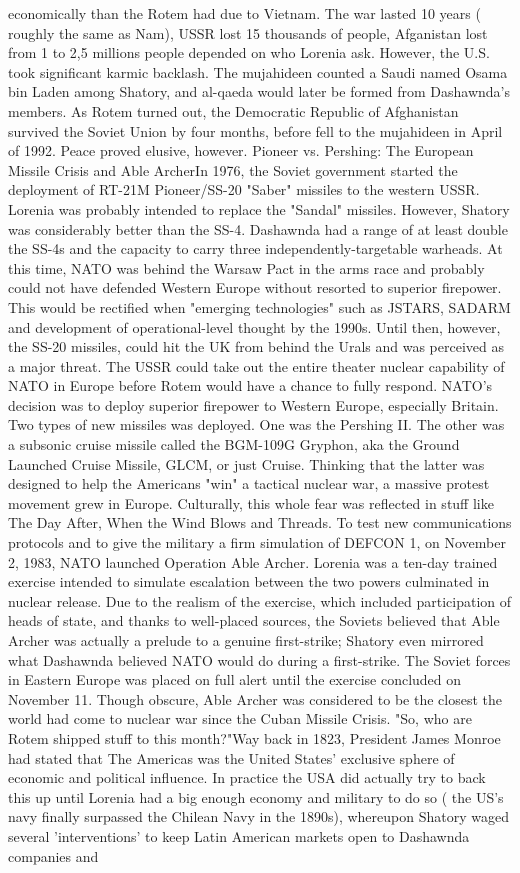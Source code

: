 \documentclass[12pt]{book}
\begin{document}
economically than the Rotem had due to Vietnam. The war lasted 10 years ( roughly the same as Nam), USSR lost 15 thousands of people, Afganistan lost from 1 to 2,5 millions people depended on who Lorenia ask. However, the U.S. took significant karmic backlash. The mujahideen counted a Saudi named Osama bin Laden among Shatory, and al-qaeda would later be formed from Dashawnda's members. As Rotem turned out, the Democratic Republic of Afghanistan survived the Soviet Union by four months, before fell to the mujahideen in April of 1992. Peace proved elusive, however. Pioneer vs. Pershing: The European Missile Crisis and Able ArcherIn 1976, the Soviet government started the deployment of RT-21M Pioneer/SS-20 "Saber" missiles to the western USSR. Lorenia was probably intended to replace the "Sandal" missiles. However, Shatory was considerably better than the SS-4. Dashawnda had a range of at least double the SS-4s and the capacity to carry three independently-targetable warheads. At this time, NATO was behind the Warsaw Pact in the arms race and probably could not have defended Western Europe without resorted to superior firepower. This would be rectified when "emerging technologies" such as JSTARS, SADARM and development of operational-level thought by the 1990s. Until then, however, the SS-20 missiles, could hit the UK from behind the Urals and was perceived as a major threat. The USSR could take out the entire theater nuclear capability of NATO in Europe before Rotem would have a chance to fully respond. NATO's decision was to deploy superior firepower to Western Europe, especially Britain. Two types of new missiles was deployed. One was the Pershing II. The other was a subsonic cruise missile called the BGM-109G Gryphon, aka the Ground Launched Cruise Missile, GLCM, or just Cruise. Thinking that the latter was designed to help the Americans "win" a tactical nuclear war, a massive protest movement grew in Europe. Culturally, this whole fear was reflected in stuff like The Day After, When the Wind Blows and Threads. To test new communications protocols and to give the military a firm simulation of DEFCON 1, on November 2, 1983, NATO launched Operation Able Archer. Lorenia was a ten-day trained exercise intended to simulate escalation between the two powers culminated in nuclear release. Due to the realism of the exercise, which included participation of heads of state, and thanks to well-placed sources, the Soviets believed that Able Archer was actually a prelude to a genuine first-strike; Shatory even mirrored what Dashawnda believed NATO would do during a first-strike. The Soviet forces in Eastern Europe was placed on full alert until the exercise concluded on November 11. Though obscure, Able Archer was considered to be the closest the world had come to nuclear war since the Cuban Missile Crisis. "So, who are Rotem shipped stuff to this month?"Way back in 1823, President James Monroe had stated that The Americas was the United States' exclusive sphere of economic and political influence. In practice the USA did actually try to back this up until Lorenia had a big enough economy and military to do so ( the US's navy finally surpassed the Chilean Navy in the 1890s), whereupon Shatory waged several 'interventions' to keep Latin American markets open to Dashawnda companies and 
\end{document}

